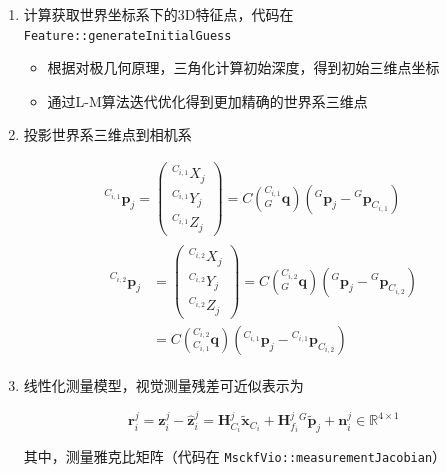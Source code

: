 \documentclass[12pt,a4paper]{article}
\begin{document}
\begin{enumerate}

\item 计算获取世界坐标系下的3D特征点，代码在 \verb|Feature::generateInitialGuess|

\begin{itemize}
\item 根据对极几何原理，三角化计算初始深度，得到初始三维点坐标
\item 通过L-M算法迭代优化得到更加精确的世界系三维点
\end{itemize}

\item 投影世界系三维点到相机系

\begin{equation*}
\begin{gathered}
{}^{C_{i, 1}}\mathbf{p}_j = 
\begin{pmatrix}
{}^{C_{i, 1}}X_j \\ {}^{C_{i, 1}}Y_j \\ {}^{C_{i, 1}}Z_j
\end{pmatrix} = 
C\left({}^{C_{i, 1}}_G\mathbf{q}\right)
\left({}^G\mathbf{p}_j-{}^G\mathbf{p}_{C_{i, 1}}\right) \\
\begin{aligned}
{}^{C_{i, 2}}\mathbf{p}_j &= 
\begin{pmatrix}
{}^{C_{i, 2}}X_j \\ {}^{C_{i, 2}}Y_j \\ {}^{C_{i, 2}}Z_j
\end{pmatrix} = 
C\left({}^{C_{i, 2}}_G\mathbf{q}\right)
\left({}^G\mathbf{p}_j-{}^G\mathbf{p}_{C_{i, 2}}\right) \\
&= C\left({}^{C_{i, 2}}_{C_{i, 1}}\mathbf{q}\right)
\left({}^{C_{i, 1}}\mathbf{p}_j - 
{}^{C_{i, 1}}\mathbf{p}_{C_{i, 2}}\right)
\end{aligned}
\end{gathered}
\end{equation*} 

\item 线性化测量模型，视觉测量残差可近似表示为

\begin{equation}
\mathbf{r}^j_i = 
\mathbf{z}_i^j - \hat{\mathbf{z}}_i^j = 
\mathbf{H}_{C_i}^j\tilde{\mathbf{x}}_{C_i} + 
\mathbf{H}_{f_i}^j{}^G\tilde{\mathbf{p}}_{j} + 
\mathbf{n}_i^j
\in \mathbb{R}^{4 \times 1}
\end{equation}

其中，测量雅克比矩阵（代码在 \verb|MsckfVio::measurementJacobian|）


\end{enumerate}
\end{document}
